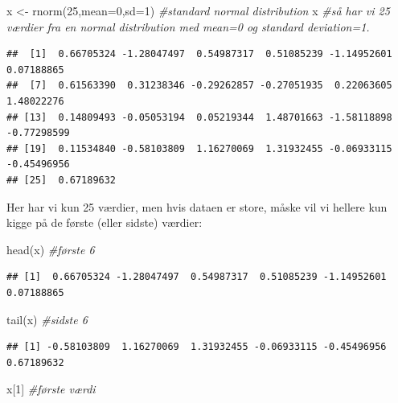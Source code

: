 \documentclass[
]{book}
\newenvironment{Shaded}{\begin{snugshade}}{\end{snugshade}}
\newcommand{\AttributeTok}[1]{\textcolor[rgb]{0.77,0.63,0.00}{#1}}
\newcommand{\CommentTok}[1]{\textcolor[rgb]{0.56,0.35,0.01}{\textit{#1}}}
\newcommand{\DecValTok}[1]{\textcolor[rgb]{0.00,0.00,0.81}{#1}}
\newcommand{\FunctionTok}[1]{\textcolor[rgb]{0.00,0.00,0.00}{#1}}
\newcommand{\NormalTok}[1]{#1}
\newcommand{\OtherTok}[1]{\textcolor[rgb]{0.56,0.35,0.01}{#1}}
\begin{document}
\begin{Shaded}
\begin{Highlighting}[]
\NormalTok{x }\OtherTok{\textless{}{-}} \FunctionTok{rnorm}\NormalTok{(}\DecValTok{25}\NormalTok{,}\AttributeTok{mean=}\DecValTok{0}\NormalTok{,}\AttributeTok{sd=}\DecValTok{1}\NormalTok{) }\CommentTok{\#standard normal distribution}
\NormalTok{x }\CommentTok{\#så har vi 25 værdier fra en normal distribution med mean=0 og standard deviation=1.}
\end{Highlighting}
\end{Shaded}

\begin{verbatim}
##  [1]  0.66705324 -1.28047497  0.54987317  0.51085239 -1.14952601  0.07188865
##  [7]  0.61563390  0.31238346 -0.29262857 -0.27051935  0.22063605  1.48022276
## [13]  0.14809493 -0.05053194  0.05219344  1.48701663 -1.58118898 -0.77298599
## [19]  0.11534840 -0.58103809  1.16270069  1.31932455 -0.06933115 -0.45496956
## [25]  0.67189632
\end{verbatim}

Her har vi kun 25 værdier, men hvis dataen er store, måske vil vi hellere kun kigge på de første (eller sidste) værdier:

\begin{Shaded}
\begin{Highlighting}[]
\FunctionTok{head}\NormalTok{(x) }\CommentTok{\#første 6}
\end{Highlighting}
\end{Shaded}

\begin{verbatim}
## [1]  0.66705324 -1.28047497  0.54987317  0.51085239 -1.14952601  0.07188865
\end{verbatim}

\begin{Shaded}
\begin{Highlighting}[]
\FunctionTok{tail}\NormalTok{(x) }\CommentTok{\#sidste 6}
\end{Highlighting}
\end{Shaded}

\begin{verbatim}
## [1] -0.58103809  1.16270069  1.31932455 -0.06933115 -0.45496956  0.67189632
\end{verbatim}

\begin{Shaded}
\begin{Highlighting}[]
\NormalTok{x[}\DecValTok{1}\NormalTok{] }\CommentTok{\#første værdi}
\end{Highlighting}
\end{Shaded}
\end{document}
